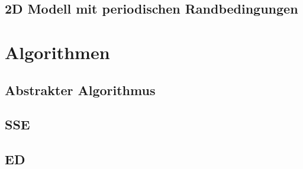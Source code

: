 \subsection{2D Modell mit periodischen Randbedingungen}

\section{Algorithmen}

\subsection{Abstrakter Algorithmus}

\subsection{SSE}

\subsection{ED}